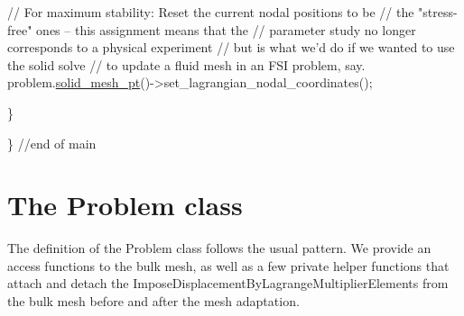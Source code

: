 \begin{DoxyCodeInclude}

   \textcolor{comment}{// For maximum stability: Reset the current nodal positions to be}
   \textcolor{comment}{// the "stress-free" ones -- this assignment means that the}
   \textcolor{comment}{// parameter study no longer corresponds to a physical experiment}
   \textcolor{comment}{// but is what we'd do if we wanted to use the solid solve}
   \textcolor{comment}{// to update a fluid mesh in an FSI problem, say.}
   problem.\hyperlink{classPrescribedBoundaryDisplacementProblem_ac0fc3028f61cec5ac4b01670d7728934}{solid\_mesh\_pt}()->set\_lagrangian\_nodal\_coordinates();
   
  \}
 
\} \textcolor{comment}{//end of main}

\end{DoxyCodeInclude}




 

\hypertarget{index_problem}{}\section{The Problem class}\label{index_problem}
The definition of the {\ttfamily Problem} class follows the usual pattern. We provide an access functions to the bulk mesh, as well as a few private helper functions that attach and detach the {\ttfamily Impose\+Displacement\+By\+Lagrange\+Multiplier\+Elements} from the bulk mesh before and after the mesh adaptation.

